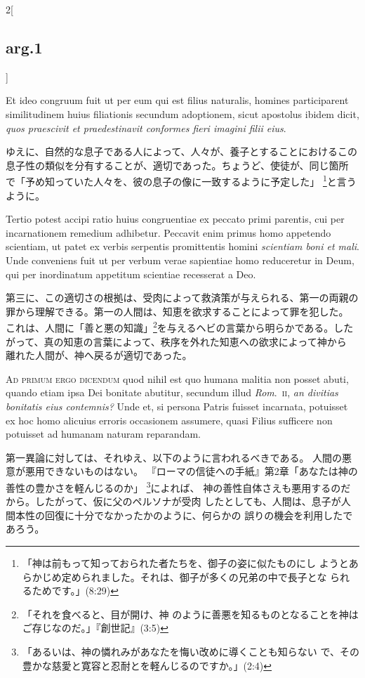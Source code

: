 \documentclass[paper=a4paper,fontsize=10pt,jafontsize=9pt,titlepage]{jlreq}
\begin{document}
\begin{paracol}{2}[\subsection{arg.1}]
\switchcolumn*

Et ideo congruum fuit ut per eum qui est filius naturalis,
homines participarent similitudinem huius filiationis secundum
adoptionem, sicut apostolus ibidem dicit, {\itshape quos praescivit et
praedestinavit conformes fieri imagini filii eius}.

\switchcolumn

ゆえに、自然的な息子である人によって、人々が、養子とすることにおけるこの
 息子性の類似を分有することが、適切であった。ちょうど、使徒が、同じ箇所
 で「予め知っていた人々を、彼の息子の像に一致するように予定した」
 \footnote{「神は前もって知っておられた者たちを、御子の姿に似たものにし
 ようとあらかじめ定められました。それは、御子が多くの兄弟の中で長子とな
 られるためです。」(8:29)}と言うように。

\switchcolumn*

Tertio potest accipi
ratio huius congruentiae ex peccato primi parentis, cui per
incarnationem remedium adhibetur. 
Peccavit enim primus homo appetendo
scientiam, ut patet ex verbis serpentis promittentis homini {\itshape scientiam
boni et mali}. Unde conveniens fuit ut per verbum verae sapientiae homo
reduceretur in Deum, qui per inordinatum appetitum scientiae recesserat
a Deo.

\switchcolumn

第三に、この適切さの根拠は、受肉によって救済策が与えられる、第一の両親の
 罪から理解できる。第一の人間は、知恵を欲求することによって罪を犯した。
 これは、人間に「善と悪の知識」\footnote{「それを食べると、目が開け、神
 のように善悪を知るものとなることを神はご存じなのだ。」『創世記』(3:5)}を与えるヘビの言葉から明らかである。した
 がって、真の知恵の言葉によって、秩序を外れた知恵への欲求によって神から
 離れた人間が、神へ戻るが適切であった。

\switchcolumn*[\subsection{ad.1}]

{\scshape Ad primum ergo dicendum} quod nihil est quo humana malitia non posset
abuti, quando etiam ipsa Dei bonitate abutitur, secundum illud {\itshape Rom}.~{\scshape ii},
{\itshape an divitias bonitatis eius contemnis?} Unde et, si persona Patris fuisset
incarnata, potuisset ex hoc homo alicuius erroris occasionem assumere,
quasi Filius sufficere non potuisset ad humanam naturam reparandam.

\switchcolumn

第一異論に対しては、それゆえ、以下のように言われるべきである。
人間の悪意が悪用できないものはない。
『ローマの信徒への手紙』第2章「あなたは神の善性の豊かさを軽んじるのか」
 \footnote{「あるいは、神の憐れみがあなたを悔い改めに導くことも知らない
 で、その豊かな慈愛と寛容と忍耐とを軽んじるのですか。」(2:4)}によれば、
 神の善性自体さえも悪用するのだから。したがって、仮に父のペルソナが受肉
 したとしても、人間は、息子が人間本性の回復に十分でなかったかのように、何らかの
 誤りの機会を利用したであろう。


\end{paracol}
\end{document}

